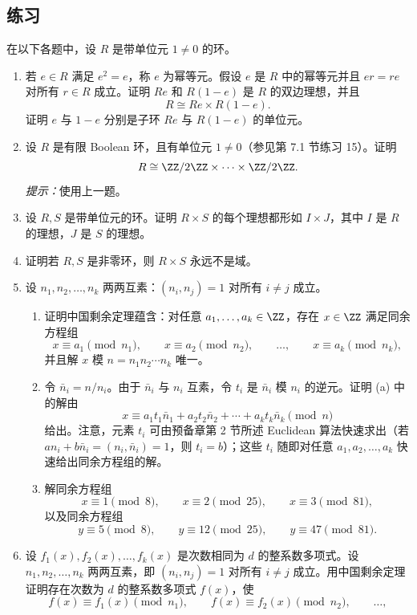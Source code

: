 \subsection*{练习}
在以下各题中，设 $R$ 是带单位元 $1\neq0$ 的环。
\begin{enumerate}[label=\arabic*.]
	\item 若 $e\in R$ 满足 $e^2=e$，称 $e$ 为幂等元。假设 $e$ 是 $R$ 中的幂等元并且 $er=re$ 对所有 $r\in R$ 成立。证明 $Re$ 和 $R(1-e)$ 是 $R$ 的双边理想，并且
	\[
	R\cong Re\times R(1-e).
	\]
	证明 $e$ 与 $1-e$ 分别是子环 $Re$ 与 $R(1-e)$ 的单位元。
	\item 设 $R$ 是有限 Boolean 环，且有单位元 $1\neq0$（参见第 7.1 节练习 15）。证明
	\[
	R\cong \ZZ/2\ZZ\times\cdots\times\ZZ/2\ZZ.
	\]
	\emph{提示：}使用上一题。
	\item 设 $R,S$ 是带单位元的环。证明 $R\times S$ 的每个理想都形如 $I\times J$，其中 $I$ 是 $R$ 的理想，$J$ 是 $S$ 的理想。
	\item 证明若 $R,S$ 是非零环，则 $R\times S$ 永远不是域。
	\item 设 $n_1,n_2,\ldots,n_k$ 两两互素：$(n_i,n_j)=1$ 对所有 $i\neq j$ 成立。
	\begin{enumerate}[label=(\alph*)]
		\item 证明中国剩余定理蕴含：对任意 $a_1,
		\ldots,a_k\in\ZZ$，存在 $x\in\ZZ$ 满足同余方程组
		\[
		x\equiv a_1\pmod {n_1},\qquad x\equiv a_2\pmod {n_2},\qquad \ldots,
		\qquad x\equiv a_k\pmod {n_k},
		\]
		并且解 $x$ 模 $n=n_1n_2\cdots n_k$ 唯一。
		\item 令 $\bar n_i=n/n_i$。由于 $\bar n_i$ 与 $n_i$ 互素，令 $t_i$ 是 $\bar n_i$ 模 $n_i$ 的逆元。证明 (a) 中的解由
		\[
		x\equiv a_1t_1\bar n_1+a_2t_2\bar n_2+\cdots+a_kt_k\bar n_k\pmod n
		\]
		给出。注意，元素 $t_i$ 可由预备章第 2 节所述 Euclidean 算法快速求出（若 $an_i+b\bar n_i=(n_i,\bar n_i)=1$，则 $t_i=b$）；这些 $t_i$ 随即对任意 $a_1,a_2,
		\ldots,a_k$ 快速给出同余方程组的解。
		\item 解同余方程组
		\[
		x\equiv1\pmod8,
		\qquad x\equiv2\pmod{25},
		\qquad x\equiv3\pmod{81},
		\]
		以及同余方程组
		\[
		y\equiv5\pmod8,
		\qquad y\equiv12\pmod{25},
		\qquad y\equiv47\pmod{81}.
		\]
	\end{enumerate}
	\item 设 $f_1(x),f_2(x),\ldots,f_k(x)$ 是次数相同为 $d$ 的整系数多项式。设 $n_1,n_2,\ldots,n_k$ 两两互素，即 $(n_i,n_j)=1$ 对所有 $i\neq j$ 成立。用中国剩余定理证明存在次数为 $d$ 的整系数多项式 $f(x)$，使
	\[
	f(x)\equiv f_1(x)\pmod {n_1},\qquad f(x)\equiv f_2(x)\pmod {n_2},\qquad \ldots,
\]
\end{enumerate}
